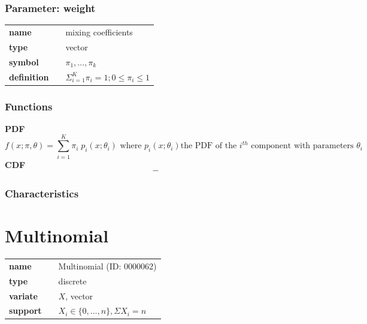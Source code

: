 \subsubsection*{Parameter: weight}

\noindent\begin{tabular}{p{2cm}cl}
\textbf{name} & & mixing coefficients \\
\textbf{type} & & vector \\
\textbf{symbol} & & $\pi_1, \ldots, \pi_k$  \\
\textbf{definition} & & $\Sigma_{i=1}^K \pi_i=1; 0\le \pi_i \le 1$
\end{tabular}
\subsubsection*{Functions}

\smallskip \noindent \hspace{.2cm} \textbf{PDF} 
\begin{equation*}f(x; \pi, \theta) = \sum_{i=1}^{K} \pi_{i}\; p_i(x; \theta_i) \text{ where } p_i(x; \theta_i) \text{the PDF of the } i^{th} \text{ component with parameters } \theta_i\end{equation*}
\smallskip \noindent \hspace{.2cm} \textbf{CDF} 
\begin{equation*}-\end{equation*}
\smallskip
\subsubsection*{Characteristics}
\smallskip
\section*{Multinomial} 

  \bigskip 

\begin{tabular}{p{2cm}cl}
\textbf{name} & & Multinomial (ID: 0000062)\\ 
 
\textbf{type} & & discrete \\ 

\textbf{variate} & & $X$, vector \\ 

\textbf{support} & & $X_i \in \{0,\dots,n\}, \Sigma X_i = n$
\end{tabular}


